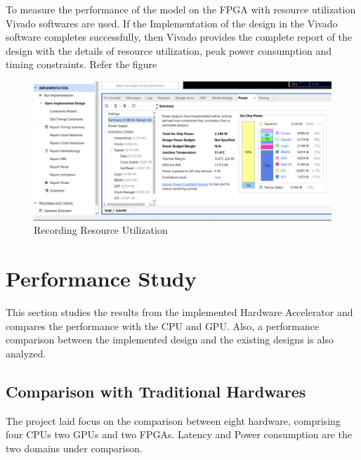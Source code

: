 \documentclass[a4paper,12pt,oneside]{book}
\begin{document}
To measure the performance of the model on the FPGA with resource utilization Vivado softwares are used. If the Implementation of the design in the Vivado software completes successfully, then Vivado provides the complete report of the design with the details of resource utilization, peak power consumption and timing constraints. Refer the figure
\begin{figure}[h!]
    \centering
    \includegraphics[scale=0.35]{images/record-util.png}
    \caption{Recording Resource Utilization}
    \label{figure:record-util}
\end{figure}

\section{Performance Study}
This section studies the results from the implemented Hardware Accelerator and compares the performance with the CPU and GPU. Also, a performance comparison between the implemented design and the existing designs is also analyzed.

\subsection*{Comparison with Traditional Hardwares}
The project laid focus on the comparison between eight hardware, comprising four CPUs
two GPUs and two FPGAs. Latency and Power consumption are the two domains under comparison.
\end{document}
